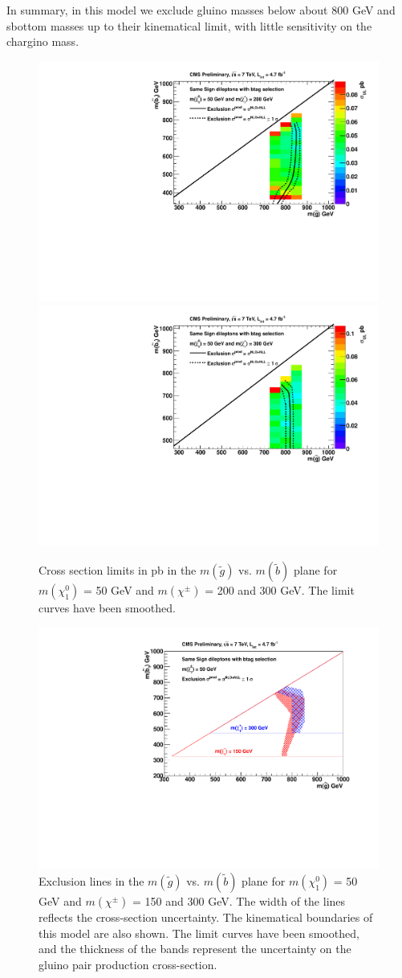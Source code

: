 In summary, in this model 
we exclude gluino masses below about 800 GeV and 
sbottom masses up to their kinematical limit,
with little sensitivity on the chargino mass.


\begin{figure}[htb]
\begin{center}
\includegraphics[width=0.49\linewidth]{figs/B2_LimitsOnCarpet_200.pdf}
\includegraphics[width=0.49\linewidth]{figs/B2_LimitsOnCarpet_300.pdf}
\caption{Cross section limits in pb in the $m(\widetilde{g})$ vs. 
$m(\widetilde{b})$ plane
for $m(\chi_1^0)$ = 50 GeV and 
$m(\chi^{\pm})$ = 200 and 300 GeV.
The limit curves have been smoothed.
\label{fig:mglinoSbottom2}}
\end{center}
\end{figure}

\begin{figure}[htb]
\begin{center}
\includegraphics[width=0.49\linewidth]{figs/B2_CheeseWedge.pdf}
\caption{Exclusion lines in the $m(\widetilde{g})$ vs. 
$m(\widetilde{b})$ plane
for $m(\chi_1^0)$ = 50 GeV and 
$m(\chi^{\pm})$ = 150 and 300 GeV.  The width of the lines
reflects the cross-section uncertainty.  The kinematical boundaries
of this model are also shown.
The limit curves have been smoothed, and the thickness of the
bands represent the uncertainty on the gluino pair production cross-section.
\label{fig:sbottom_cheese}}
\end{center}
\end{figure}




